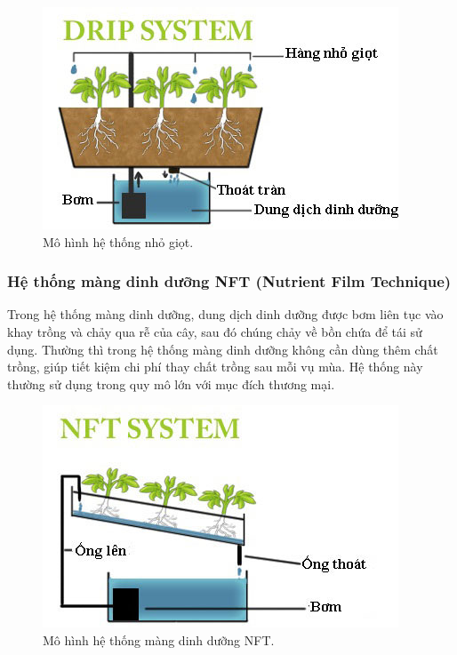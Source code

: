 \documentclass[a4paper,12pt,oneside]{article}
\begin{document}
\begin{center}

\begin{figure}[htp]
\begin{center}
\includegraphics[scale=.9]{hinh/Drip_system.jpg}
\end{center}
\caption{Mô hình hệ thống nhỏ giọt.}

\end{figure}
\end{center}

\subsubsection{Hệ thống màng dinh dưỡng NFT (Nutrient Film Technique)}
\noindent Trong hệ thống màng dinh dưỡng, dung dịch dinh dưỡng được bơm liên tục vào khay trồng và chảy qua rễ của cây, sau đó chúng chảy về bồn chứa để tái sử dụng. Thường thì trong hệ thống màng dinh dưỡng không cần dùng thêm chất trồng, giúp tiết kiệm chi phí thay chất trồng sau mỗi vụ mùa. Hệ thống này thường sử dụng trong quy mô lớn với mục đích thương mại.\\

\begin{center}
\begin{figure}[htp]
\begin{center}
\includegraphics[scale=.8]{hinh/NFT_system.jpg}
\end{center}
\caption{Mô hình hệ thống màng dinh dưỡng NFT.}
\end{figure}
\end{center}
\end{document}
